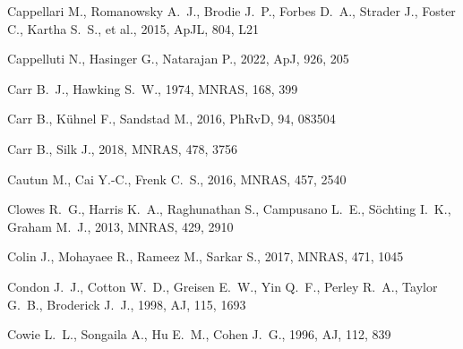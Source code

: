 \documentclass[fleqn,usenatbib]{mnras}
\begin{document}
\begin{thebibliography}{}


 Cappellari M., Romanowsky A.~J., Brodie J.~P., Forbes D.~A., Strader J., Foster C., Kartha S.~S., et al., 2015, ApJL, 804, L21

 Cappelluti N., Hasinger G., Natarajan P., 2022, ApJ, 926, 205

 Carr B.~J., Hawking S.~W., 1974, MNRAS, 168, 399

 Carr B., K{\"u}hnel F., Sandstad M., 2016, PhRvD, 94, 083504

 Carr B., Silk J., 2018, MNRAS, 478, 3756

 Cautun M., Cai Y.-C., Frenk C.~S., 2016, MNRAS, 457, 2540

 Clowes R.~G., Harris K.~A., Raghunathan S., Campusano L.~E., S{\"o}chting I.~K., Graham M.~J., 2013, MNRAS, 429, 2910

 Colin J., Mohayaee R., Rameez M., Sarkar S., 2017, MNRAS, 471, 1045


 Condon J.~J., Cotton W.~D., Greisen E.~W., Yin Q.~F., Perley R.~A., Taylor G.~B., Broderick J.~J., 1998, AJ, 115, 1693

 Cowie L.~L., Songaila A., Hu E.~M., Cohen J.~G., 1996, AJ, 112, 839


\end{thebibliography}
\end{document}
